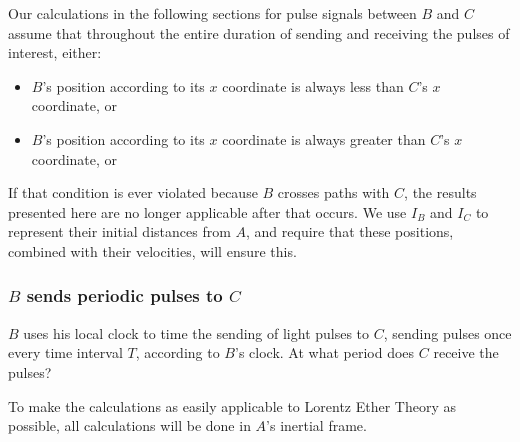 \documentclass[a4paper]{article}
\theoremstyle{plain}
\theoremstyle{definition}
\begin{document}
Our calculations in the following sections for pulse signals between
$B$ and $C$ assume that throughout the entire duration of sending and
receiving the pulses of interest, either:
\begin{itemize}
\item $B$'s position according to its $x$ coordinate is always less
  than $C$'s $x$ coordinate, or
\item $B$'s position according to its $x$ coordinate is always greater
  than $C$'s $x$ coordinate, or
\end{itemize}
If that condition is ever violated because $B$ crosses paths with $C$,
the results presented here are no longer applicable after that occurs.
We use $I_B$ and $I_C$ to represent their initial distances from $A$,
and require that these positions, combined with their velocities, will
ensure this.


\subsubsection{$B$ sends periodic pulses to $C$}
\label{sec:scen1b-BtoCLETfriendly}

$B$ uses his local clock to time the sending of light pulses to $C$,
sending pulses once every time interval $T$, according to $B$'s clock.
At what period does $C$ receive the pulses?

To make the calculations as easily applicable to Lorentz Ether Theory
as possible, all calculations will be done in $A$'s inertial frame.
\end{document}
